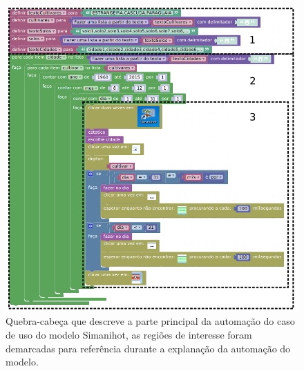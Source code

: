 \documentclass[tg]{mdtufsm}
\begin{document}
                    \begin{figure}[!htb]
                        {\centering
                        \includegraphics[width=1.0\textwidth]{imagens/coreSimani.png}
                        \caption{Quebra-cabeça que descreve a parte principal da automação do caso de uso do modelo Simanihot, as regiões de interesse foram demarcadas para referência durante a explanação da automação do modelo.}
                        \label{fig:coreSimani}}
                    \end{figure}
\end{document}
